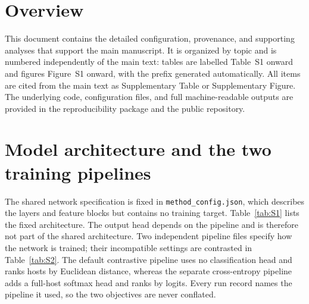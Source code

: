 \documentclass[utf8]{frontiers_suppmat}
\begin{document}
\onecolumn
{}

\title {{}}

\maketitle

\section{Overview}

This document contains the detailed configuration, provenance, and supporting analyses that
support the main manuscript. It is organized by topic and is numbered independently of the
main text: tables are labelled Table~S1 onward and figures Figure~S1 onward, with the prefix
generated automatically. All items are cited from the main text as Supplementary Table or
Supplementary Figure. The underlying code, configuration files, and full machine-readable
outputs are provided in the reproducibility package and the public repository.

\section{Model architecture and the two training pipelines}

The shared network specification is fixed in \texttt{method\_config.json}, which describes the
layers and feature blocks but contains no training target. Table~\ref{tab:S1} lists the fixed
architecture. The output head depends on the pipeline and is therefore not part of the shared
architecture. Two independent pipeline files specify how the network is trained; their
incompatible settings are contrasted in Table~\ref{tab:S2}. The default contrastive pipeline
uses no classification head and ranks hosts by Euclidean distance, whereas the separate
cross-entropy pipeline adds a full-host softmax head and ranks by logits. Every run record
names the pipeline it used, so the two objectives are never conflated.
\end{document}
